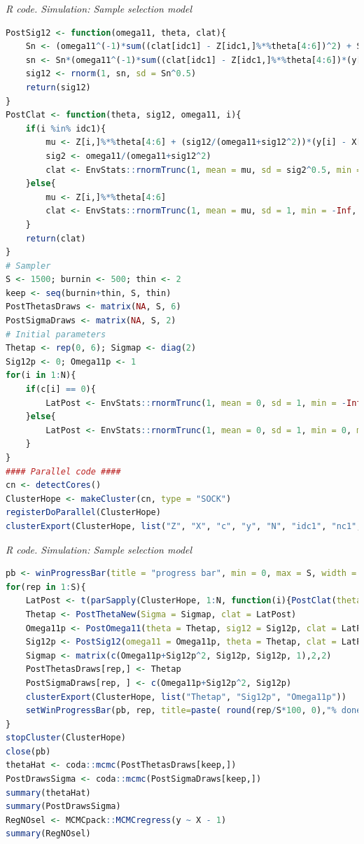 \begin{tcolorbox}[enhanced,width=4.67in,center upper,
	fontupper=\large\bfseries,drop shadow southwest,sharp corners]
	\textit{R code. Simulation: Sample selection model}
	\begin{VF}
		\begin{lstlisting}[language=R]	
PostSig12 <- function(omega11, theta, clat){
	Sn <- (omega11^(-1)*sum((clat[idc1] - Z[idc1,]%*%theta[4:6])^2) + S0i)^(-1)
	sn <- Sn*(omega11^(-1)*sum((clat[idc1] - Z[idc1,]%*%theta[4:6])*(y[idc1] - X[idc1,]%*%theta[1:3])) + s0*S0i)
	sig12 <- rnorm(1, sn, sd = Sn^0.5)
	return(sig12)
}
PostClat <- function(theta, sig12, omega11, i){
	if(i %in% idc1){
		mu <- Z[i,]%*%theta[4:6] + (sig12/(omega11+sig12^2))*(y[i] - X[i,]%*%theta[1:3])
		sig2 <- omega11/(omega11+sig12^2)
		clat <- EnvStats::rnormTrunc(1, mean = mu, sd = sig2^0.5, min = 0, max = Inf)
	}else{
		mu <- Z[i,]%*%theta[4:6]
		clat <- EnvStats::rnormTrunc(1, mean = mu, sd = 1, min = -Inf, max = 0)
	}
	return(clat)
}
# Sampler
S <- 1500; burnin <- 500; thin <- 2
keep <- seq(burnin+thin, S, thin)
PostThetasDraws <- matrix(NA, S, 6)
PostSigmaDraws <- matrix(NA, S, 2)
# Initial parameters
Thetap <- rep(0, 6); Sigmap <- diag(2) 
Sig12p <- 0; Omega11p <- 1
for(i in 1:N){
	if(c[i] == 0){
		LatPost <- EnvStats::rnormTrunc(1, mean = 0, sd = 1, min = -Inf, max = 0)
	}else{
		LatPost <- EnvStats::rnormTrunc(1, mean = 0, sd = 1, min = 0, max = Inf)
	}
}
#### Parallel code ####
cn <- detectCores() 
ClusterHope <- makeCluster(cn, type = "SOCK")
registerDoParallel(ClusterHope)
clusterExport(ClusterHope, list("Z", "X", "c", "y", "N", "idc1", "nc1", "PostClat","Thetap", "Sig12p", "Omega11p"))
\end{lstlisting}
	\end{VF}
\end{tcolorbox}  

\begin{tcolorbox}[enhanced,width=4.67in,center upper,
	fontupper=\large\bfseries,drop shadow southwest,sharp corners]
	\textit{R code. Simulation: Sample selection model}
	\begin{VF}
		\begin{lstlisting}[language=R]	
pb <- winProgressBar(title = "progress bar", min = 0, max = S, width = 300)
for(rep in 1:S){
	LatPost <- t(parSapply(ClusterHope, 1:N, function(i){PostClat(theta = Thetap, sig12 = Sig12p, omega11 = Omega11p, i)}))
	Thetap <- PostThetaNew(Sigma = Sigmap, clat = LatPost)
	Omega11p <- PostOmega11(theta = Thetap, sig12 = Sig12p, clat = LatPost)
	Sig12p <- PostSig12(omega11 = Omega11p, theta = Thetap, clat = LatPost)
	Sigmap <- matrix(c(Omega11p+Sig12p^2, Sig12p, Sig12p, 1),2,2)
	PostThetasDraws[rep,] <- Thetap
	PostSigmaDraws[rep, ] <- c(Omega11p+Sig12p^2, Sig12p)
	clusterExport(ClusterHope, list("Thetap", "Sig12p", "Omega11p"))
	setWinProgressBar(pb, rep, title=paste( round(rep/S*100, 0),"% done"))
}
stopCluster(ClusterHope)
close(pb)
thetaHat <- coda::mcmc(PostThetasDraws[keep,])
PostDrawsSigma <- coda::mcmc(PostSigmaDraws[keep,])
summary(thetaHat)
summary(PostDrawsSigma)
RegNOsel <- MCMCpack::MCMCregress(y ~ X - 1)
summary(RegNOsel)
\end{lstlisting}
	\end{VF}
\end{tcolorbox}


